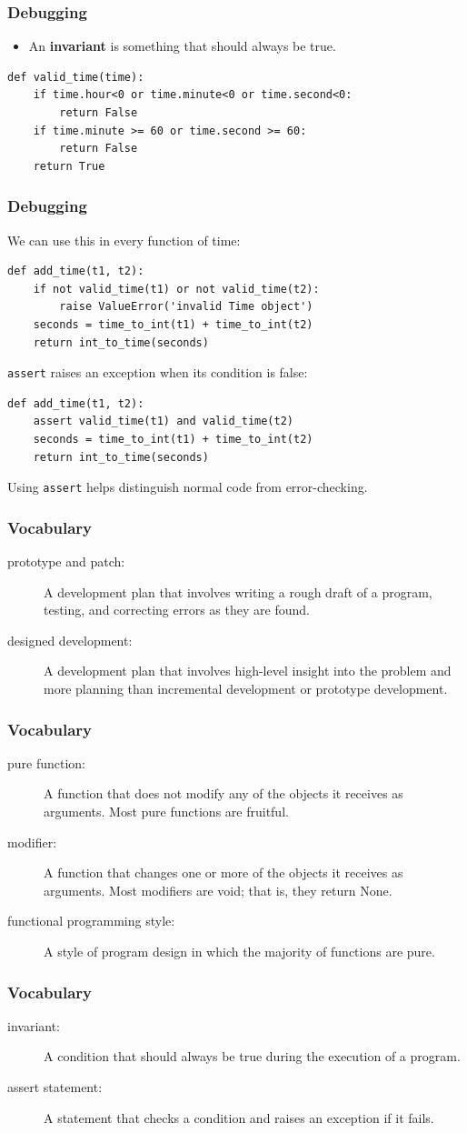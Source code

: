 \documentclass{beamer}
\newcommand{\bi}{\begin{itemize}}
\newcommand{\li}{\item}
\newcommand{\ei}{\end{itemize}}
\newcommand{\bfr}[1]{\begin{frame}[fragile]\frametitle{{ #1 }}}
\begin{document}
\bfr{Debugging}
\bi
\li
An {\bf invariant} is something that should always be true.
\ei
\begin{lstlisting}
def valid_time(time):
    if time.hour<0 or time.minute<0 or time.second<0:
        return False
    if time.minute >= 60 or time.second >= 60:
        return False
    return True
\end{lstlisting}
\end{frame}
\bfr{Debugging}
We can use this in every function of time:
\begin{lstlisting}
def add_time(t1, t2):
    if not valid_time(t1) or not valid_time(t2):
        raise ValueError('invalid Time object')
    seconds = time_to_int(t1) + time_to_int(t2)
    return int_to_time(seconds)
\end{lstlisting}
\lstinline{assert} raises an exception when its condition is false:
\begin{lstlisting}
def add_time(t1, t2):
    assert valid_time(t1) and valid_time(t2)
    seconds = time_to_int(t1) + time_to_int(t2)
    return int_to_time(seconds)
\end{lstlisting}
Using \lstinline{assert} helps distinguish normal code from
error-checking.


\end{frame}
\bfr{Vocabulary}
\begin{description}
\li[prototype and patch:]
A development plan that involves writing a rough draft of a program, testing, and correcting errors as they are found.
\li[designed development:]
A development plan that involves high-level insight into the problem and more planning than incremental development or prototype development.
\end{description}
\end{frame}
\bfr{Vocabulary}
\begin{description}
\li[pure function:]
A function that does not modify any of the objects it receives as arguments. Most pure functions are fruitful.
\li[modifier:]
A function that changes one or more of the objects it receives as arguments. Most modifiers are void; that is, they return None.
\li[functional programming style:]
A style of program design in which the majority of functions are pure.
\end{description}
\end{frame}
\bfr{Vocabulary}
\begin{description}
\li[invariant:]
A condition that should always be true during the execution of a program.
\li[assert statement:]
A statement that checks a condition and raises an exception if it fails.
\end{description}

\end{frame}
\end{document}
